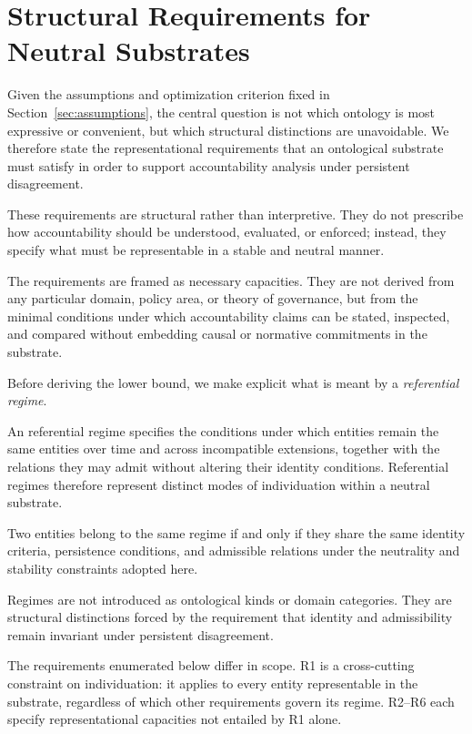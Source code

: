 
\section{Structural Requirements for Neutral Substrates}
\label{sec:requirements}


Given the assumptions and optimization criterion
fixed in Section~\ref{sec:assumptions},
the central question is not which ontology is most expressive or convenient,
but which structural distinctions are unavoidable.
We therefore state the representational requirements
that an ontological substrate must satisfy in order to
support accountability analysis under persistent disagreement.

These requirements are structural rather than interpretive.
They do not prescribe how accountability
should be understood, evaluated, or enforced; instead,
they specify what must be representable in a stable and neutral manner.

The requirements are framed as necessary capacities.
They are not derived from any
particular domain, policy area, or theory of governance,
but from the minimal conditions under which accountability claims
can be stated, inspected, and compared
without embedding causal or normative commitments in the substrate.

Before deriving the lower bound, we make explicit what is meant by a
\emph{referential regime}.

\begin{definition}
An referential regime specifies the conditions under which
entities remain the same entities over time and across incompatible extensions,
together with the relations they may admit without altering their identity conditions.
Referential regimes therefore represent
distinct modes of individuation within a neutral substrate.
\end{definition}

Two entities belong to the same regime if and only if
they share the same \stabilitycritical{} identity criteria,
persistence conditions, and admissible relations under
the neutrality and stability constraints adopted here.

Regimes are not introduced as ontological kinds or domain categories.
They are structural distinctions forced by the requirement that identity and
admissibility remain invariant under persistent disagreement.

The requirements enumerated below differ in scope.
R1 is a cross-cutting constraint on individuation:
it applies to every entity representable in the substrate,
regardless of which other requirements govern its regime.
R2--R6 each specify representational capacities not entailed by R1 alone.

